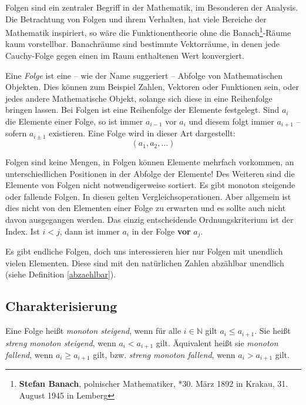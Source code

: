 Folgen sind ein zentraler Begriff in der Mathematik, im Besonderen der Analysis. Die Betrachtung von Folgen und ihrem Verhalten, hat viele Bereiche der Mathematik inspiriert, so wäre die Funktionentheorie ohne die Banach\footnote{\textbf{Stefan Banach}, polnischer Mathematiker,  *30. März 1892 in Krakau, 31. August 1945 in Lemberg}-Räume kaum vorstellbar.  Banachräume sind bestimmte Vektorräume, in denen jede Cauchy-Folge gegen einen im Raum enthaltenen Wert konvergiert.

\begin{definition}
Eine \emph{Folge} ist eine -- wie der Name suggeriert -- Abfolge von Mathematischen Objekten. Dies können zum Beispiel Zahlen, Vektoren oder Funktionen sein, oder jedes andere Mathematische Objekt, solange sich diese in eine Reihenfolge bringen lassen. Bei Folgen ist eine Reihenfolge der Elemente festgelegt. Sind $a_i$ die Elemente einer Folge, so ist immer $a_{i-1}$ vor $a_i$ und diesem folgt immer $a_{i+1}$ -- sofern $a_{i\pm 1}$ existieren. Eine Folge wird in dieser Art dargestellt:
\[
(a_1, a_2, \dots)
\]
\end{definition}

Folgen sind keine Mengen, in Folgen können Elemente mehrfach vorkommen, an unterschiedlichen Positionen in der Abfolge der Elemente! Des Weiteren sind die Elemente von Folgen nicht notwendigerweise sortiert. Es gibt monoton steigende oder fallende Folgen. In diesen gelten Vergleichsoperationen. Aber allgemein ist dies nicht von den Elementen einer Folge zu erwarten und es sollte auch nicht davon ausgegangen werden. Das einzig entscheidende Ordnungskriterium ist der Index. Ist $i<j$, dann ist immer $a_i$ in der Folge \textbf{vor} $a_j$.

Es gibt endliche Folgen, doch uns interessieren hier nur Folgen mit unendlich vielen Elementen. Diese sind mit den natürlichen Zahlen abzählbar unendlich (siehe Definition \ref{abzaehlbar}).

\subsection{Charakterisierung}

\begin{definition}
Eine Folge heißt \emph{monoton steigend}, wenn für alle $i\in \mathbb{N}$ gilt $a_i\le a_{i+1}$. Sie heißt \emph{streng monoton steigend}, wenn $a_i < a_{i+1}$ gilt. Äquivalent heißt sie \emph{monoton fallend}, wenn $a_i\ge a_{i+1}$ gilt, bzw. \emph{streng monoton fallend}, wenn $a_i > a_{i+1}$ gilt.
\end{definition}

